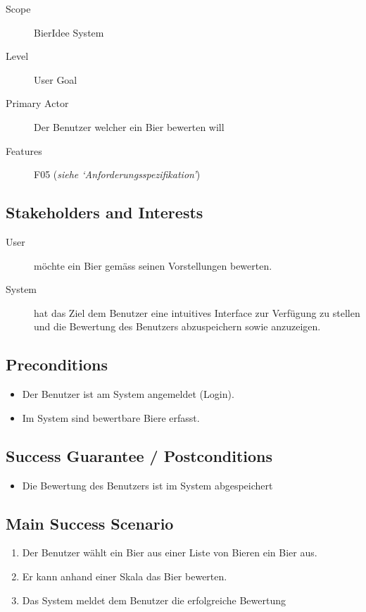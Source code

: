 \documentclass[10pt,a4paper]{scrartcl}
\begin{document}
\begin{description}
\item[Scope] BierIdee System
\item[Level] User Goal
\item[Primary Actor] Der Benutzer welcher ein Bier bewerten will
\item[Features] F05 (\textit{siehe `Anforderungsspezifikation'})
\end{description}


\subsection*{Stakeholders and Interests}

\begin{description}
\item[User] möchte ein Bier gemäss seinen Vorstellungen bewerten.
\item[System] hat das Ziel dem Benutzer eine intuitives Interface zur Verfügung zu stellen und die Bewertung des Benutzers abzuspeichern sowie anzuzeigen.
\end{description}


\subsection*{Preconditions}

\begin{itemize}
\item Der Benutzer ist am System angemeldet (Login).
\item Im System sind bewertbare Biere erfasst.
\end{itemize}


\subsection*{Success Guarantee / Postconditions}
\begin{itemize}
\item Die Bewertung des Benutzers ist im System abgespeichert
\end{itemize}


\subsection*{Main Success Scenario}

\begin{enumerate}
\item Der Benutzer wählt ein Bier aus einer Liste von Bieren ein Bier aus.
\item Er kann anhand einer Skala das Bier bewerten.
\item Das System meldet dem Benutzer die erfolgreiche Bewertung
\end{enumerate}
\end{document}
